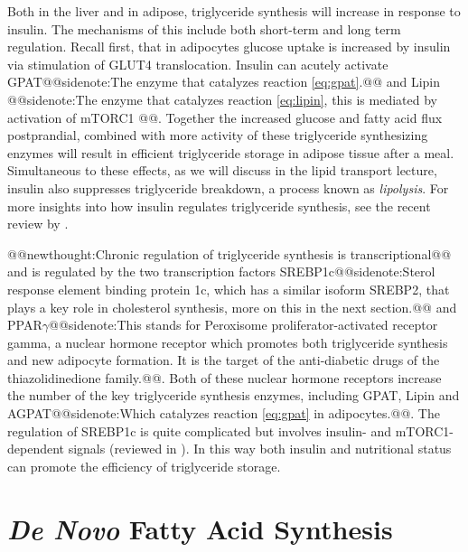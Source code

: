 \documentclass{tufte-handout}
\makeatletter
\def\newthought#1{@@newthought:#1@@}
\def\sidenote#1{@@sidenote:#1@@}
\makeatother
\begin{document}
Both in the liver and in adipose, triglyceride synthesis will increase in response to insulin.  The mechanisms of this include both short-term and long term regulation.  Recall first, that in adipocytes glucose uptake is increased by insulin via stimulation of GLUT4 translocation.  Insulin can acutely activate GPAT\sidenote{The enzyme that catalyzes reaction \ref{eq:gpat}.} and Lipin \sidenote{The enzyme that catalyzes reaction \ref{eq:lipin}, this is mediated by activation of mTORC1 \citep{Harris2007}}.  Together the increased glucose and fatty acid flux postprandial, combined with more activity of these triglyceride synthesizing enzymes will result in efficient triglyceride storage in adipose tissue after a meal. Simultaneous to these effects, as we will discuss in the lipid transport lecture, insulin also suppresses triglyceride breakdown, a process known as \emph{lipolysis}.  For more insights into how insulin regulates triglyceride synthesis, see the recent review by \citet{Coleman2011}.

\newthought{Chronic regulation of triglyceride synthesis is transcriptional} and is regulated by the two transcription factors SREBP1c\sidenote{Sterol response element binding protein 1c, which has a similar isoform SREBP2\index{Transcription Factors!SREBP}, that plays a key role in cholesterol synthesis, more on this in the next section.} and PPAR$\gamma$\sidenote{This stands for Peroxisome proliferator-activated receptor gamma, a nuclear hormone receptor which promotes both triglyceride synthesis and new adipocyte formation.  It is the target of the anti-diabetic drugs of the thiazolidinedione family.}. Both of these nuclear hormone receptors increase the number of the key triglyceride synthesis enzymes, including GPAT, Lipin and AGPAT\sidenote{Which catalyzes reaction \ref{eq:gpat} in adipocytes.}. The regulation of SREBP1c is quite complicated but involves insulin- and mTORC1-dependent signals (reviewed in \citet{Bakan2012}). In this way both insulin and nutritional status can promote the efficiency of triglyceride storage.



\section{\textit{De Novo} Fatty Acid Synthesis}
\end{document}
